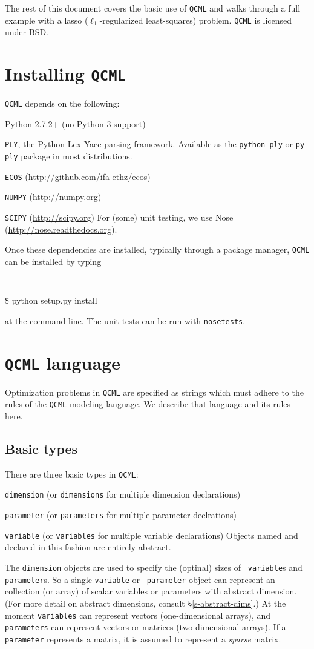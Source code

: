 \documentclass[11pt]{article}
\def\qcml{\texttt{QCML}\xspace}
\begin{document}
The rest of this document covers the basic use of \qcml and walks through a
full example with a lasso ($\ell_1$-regularized least-squares) problem. 
\qcml is licensed under BSD. 

\section{Installing \qcml}
\qcml depends on the following:
\BIT 
\item Python 2.7.2+ (no Python 3 support)
\item \href{http://www.dabeaz.com/ply/}{\tt PLY}, the Python Lex-Yacc parsing framework.
  Available as the {\tt python-ply} or {\tt py-ply} package in most distributions.
\item {\tt ECOS} (\url{http://github.com/ifa-ethz/ecos})
\item {\tt NUMPY} (\url{http://numpy.org})
\item {\tt SCIPY} (\url{http://scipy.org})
\EIT
For (some) unit testing, we use Nose (\url{http://nose.readthedocs.org}).

Once these dependencies are installed, typically through a package manager,
\qcml can be installed by typing
{\tt
\begin{tabbing}
  \qquad \= \$ python setup.py install
\end{tabbing}
}
\noindent at the command line. The unit tests can be run with {\tt nosetests}.

\section{\qcml language}
Optimization problems in \qcml are specified as strings which must adhere to 
the rules of the \qcml modeling language. We describe that language and its
rules here.

\subsection{Basic types}
There are three basic types in \qcml:
\BIT
\item {\tt dimension} (or {\tt dimensions} for multiple dimension declarations)
\item {\tt parameter} (or {\tt parameters} for multiple parameter declrations)
\item {\tt variable} (or {\tt variables} for multiple variable declarations)
\EIT
Objects named and declared in this fashion are entirely abstract.

The {\tt dimension} objects are used to specify the (optinal) sizes of {\tt
variable}s and {\tt parameter}s. So a single {\tt variable} or {\tt
parameter} object can represent an collection (or array) of scalar variables
or parameters with abstract dimension. (For more detail on abstract
dimensions, consult \S\ref{s-abstract-dims}.) At the moment {\tt variables}
can represent vectors (one-dimensional arrays), and {\tt parameters} can
represent vectors or matrices (two-dimensional arrays). If a {\tt parameter}
represents a matrix, it is assumed to represent a \emph{sparse} matrix.
\end{document}
